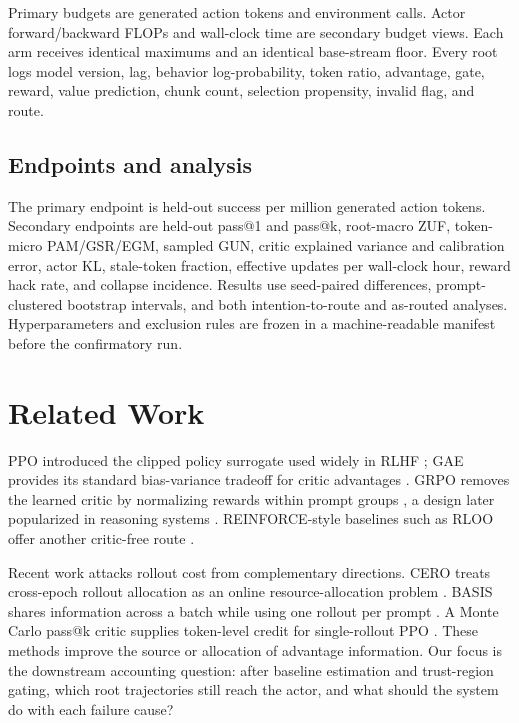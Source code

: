 \documentclass{article}
\begin{document}
Primary budgets are generated action tokens and environment calls.  Actor
forward/backward FLOPs and wall-clock time are secondary budget views.  Each
arm receives identical maximums and an identical base-stream floor.  Every
root logs model version, lag, behavior log-probability, token ratio, advantage,
gate, reward, value prediction, chunk count, selection propensity, invalid
flag, and route.

\subsection{Endpoints and analysis}

The primary endpoint is held-out success per million generated action tokens.
Secondary endpoints are held-out pass@1 and pass@k, root-macro ZUF, token-micro
PAM/GSR/EGM, sampled GUN, critic explained variance and calibration error,
actor KL, stale-token fraction, effective updates per wall-clock hour, reward
hack rate, and collapse incidence.  Results use seed-paired differences,
prompt-clustered bootstrap intervals, and both intention-to-route and
as-routed analyses.  Hyperparameters and exclusion rules are frozen in a
machine-readable manifest before the confirmatory run.

\section{Related Work}

PPO introduced the clipped policy surrogate used widely in RLHF
\citep{schulman2017ppo,ouyang2022training}; GAE provides its standard
bias-variance tradeoff for critic advantages \citep{schulman2016gae}.
GRPO removes the learned critic by normalizing rewards within prompt groups
\citep{shao2024deepseekmath}, a design later popularized in reasoning systems
\citep{deepseekai2025r1}.  REINFORCE-style baselines such as RLOO offer another
critic-free route \citep{ahmadian2024back}.

Recent work attacks rollout cost from complementary directions.  CERO treats
cross-epoch rollout allocation as an online resource-allocation problem
\citep{zong2026cero}.  BASIS shares information across a batch while using one
rollout per prompt \citep{gong2026basis}.  A Monte Carlo pass@k critic supplies
token-level credit for single-rollout PPO \citep{che2026single}.  These methods
improve the source or allocation of advantage information.  Our focus is the
downstream accounting question: after baseline estimation and trust-region
gating, which root trajectories still reach the actor, and what should the
system do with each failure cause?
\end{document}
